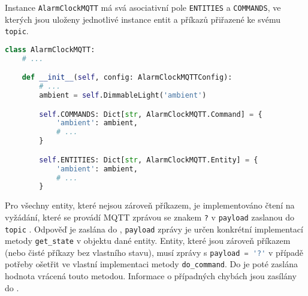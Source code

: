 Instance \texttt{AlarmClockMQTT} má svá asociativní pole
\texttt{ENTITIES} a \texttt{COMMANDS}, ve kterých jsou uloženy jednotlivé
instance entit a příkazů přiřazené ke svému \texttt{topic}.

\begin{lstlisting}[language=Python]
class AlarmClockMQTT:
    # ...

    def __init__(self, config: AlarmClockMQTTConfig):
        # ...
        ambient = self.DimmableLight('ambient')

        self.COMMANDS: Dict[str, AlarmClockMQTT.Command] = {
            'ambient': ambient,
            # ...
        }

        self.ENTITIES: Dict[str, AlarmClockMQTT.Entity] = {
            'ambient': ambient,
            # ...
        }
\end{lstlisting}

Pro všechny entity, které nejsou zároveň příkazem, je implementováno čtení na
vyžádání, které se provádí MQTT zprávou se znakem \texttt{?} v \texttt{payload}
zaslanou do \texttt{topic} . Odpověď je
zaslána do , \texttt{payload} zprávy je
určen konkrétní implementací metody \verb|get_state| v objektu dané entity.
Entity, které jsou zároveň příkazem (nebo čisté příkazy bez vlastního stavu),
musí zprávy s \lstinline[language=Python]!payload = '?'! v případě potřeby
ošetřit ve vlastní implementaci metody \verb|do_command|. Do
 je poté zaslána hodnota vrácená touto
metodou. Informace o případných chybách jsou zasílány do
.


